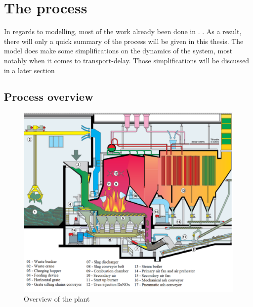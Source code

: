 \chapter{The process}
 
\label{cha:first_principles_model}
In regards to modelling, most of the work already been done in \cite{waste_prof}. . As a result, there will only a quick summary of the process will be given in this thesis. The model does make some simplifications on the dynamics of the system, most notably when it comes to transport-delay. Those simplifications will be discussed in a later section 


\section{Process overview}

\begin{figure}[htbp]
    \centering
    \includegraphics[width=\textwidth]{img/plant_overview.png}
    \caption{Overview of the plant}
    \label{fig:plant_overview}
  \end{figure}
  

